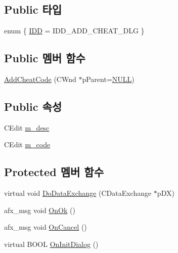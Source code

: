 \subsection*{Public 타입}
\begin{DoxyCompactItemize}
\item 
enum \{ \mbox{\hyperlink{class_add_cheat_code_a360bc0f5ed2a9d0598c246993ecb57c2a7065caea1931a69dc54b0161b9295ba9}{I\+DD}} = I\+D\+D\+\_\+\+A\+D\+D\+\_\+\+C\+H\+E\+A\+T\+\_\+\+D\+LG
 \}
\end{DoxyCompactItemize}
\subsection*{Public 멤버 함수}
\begin{DoxyCompactItemize}
\item 
\mbox{\hyperlink{class_add_cheat_code_a6904f72f50b5354c479d73ea19dba1ab}{Add\+Cheat\+Code}} (C\+Wnd $\ast$p\+Parent=\mbox{\hyperlink{_system_8h_a070d2ce7b6bb7e5c05602aa8c308d0c4}{N\+U\+LL}})
\end{DoxyCompactItemize}
\subsection*{Public 속성}
\begin{DoxyCompactItemize}
\item 
C\+Edit \mbox{\hyperlink{class_add_cheat_code_a5bbe6b54e71db26da7b3abc7449b3342}{m\+\_\+desc}}
\item 
C\+Edit \mbox{\hyperlink{class_add_cheat_code_a9ae1d05acf10bc6fc8ea8cce2ec2cc6a}{m\+\_\+code}}
\end{DoxyCompactItemize}
\subsection*{Protected 멤버 함수}
\begin{DoxyCompactItemize}
\item 
virtual void \mbox{\hyperlink{class_add_cheat_code_af260d01bd5166f11c1e92894e36c7ad6}{Do\+Data\+Exchange}} (C\+Data\+Exchange $\ast$p\+DX)
\item 
afx\+\_\+msg void \mbox{\hyperlink{class_add_cheat_code_a77b1ec1f5e067495aef92a2f9b8750c8}{On\+Ok}} ()
\item 
afx\+\_\+msg void \mbox{\hyperlink{class_add_cheat_code_abbf22fde6ad9aa52439e4cb4a3d8418b}{On\+Cancel}} ()
\item 
virtual B\+O\+OL \mbox{\hyperlink{class_add_cheat_code_a7818441d921e63c1b0983e86b60beeba}{On\+Init\+Dialog}} ()
\end{DoxyCompactItemize}


